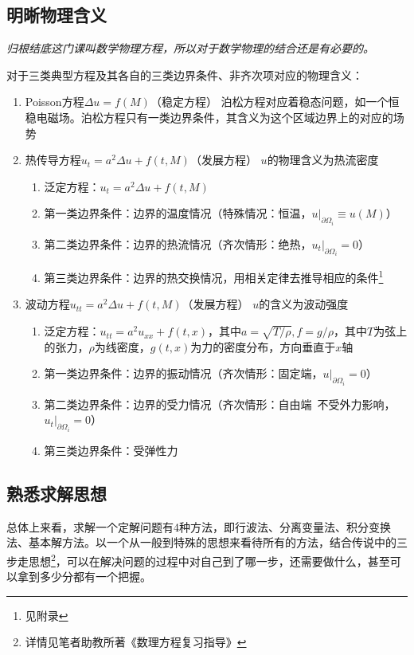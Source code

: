 \documentclass[]{report}
\begin{document}
		\subsection{明晰物理含义}
		\textit{归根结底这门课叫数学物理方程，所以对于数学物理的结合还是有必要的。}\par
		对于三类典型方程及其各自的三类边界条件、非齐次项对应的物理含义：\par
		\begin{enumerate}
			\item Poisson方程$\Delta u=f(M)$（稳定方程）\newline
			泊松方程对应着稳态问题，如一个恒稳电磁场。泊松方程只有一类边界条件，其含义为这个区域边界上的对应的场势
			\item 热传导方程$u_t=a^2\Delta u+f(t,M)$（发展方程）\newline
			$u$的物理含义为热流密度
			\begin{enumerate}
				\item 泛定方程：$u_t=a^2\Delta u+f(t,M)$
				\item 第一类边界条件：边界的温度情况（特殊情况：恒温，$u|_{\partial\Omega_i}\equiv u(M)$）
				\item 第二类边界条件：边界的热流情况（齐次情形：绝热，$u_t\vert_{\partial\Omega_i}=0$）
				\item 第三类边界条件：边界的热交换情况，用相关定律去推导相应的条件\footnote{见附录}
			\end{enumerate}
			\item 波动方程$u_{tt}=a^2\Delta u+f(t,M)$（发展方程）\newline
			$u$的含义为波动强度
			\begin{enumerate}
				\item 泛定方程：$u_{tt}=a^2u_{xx}+f(t,x)$，其中$a=\sqrt{T/\rho},f=g/\rho$，其中$T$为弦上的张力，$\rho$为线密度，$g(t,x)$为力的密度分布，方向垂直于$x$轴
				\item 第一类边界条件：边界的振动情况（齐次情形：固定端，$u|_{\partial\Omega_i}=0$）
				\item 第二类边界条件：边界的受力情况（齐次情形：自由端\ 不受外力影响，$u_t|_{\partial\Omega_i}=0$）
				\item 第三类边界条件：受弹性力
			\end{enumerate}
		\end{enumerate}\par
		\subsection{熟悉求解思想}
		总体上来看，求解一个定解问题有4种方法，即行波法、分离变量法、积分变换法、基本解方法。以一个从一般到特殊的思想来看待所有的方法，结合传说中的三步走思想\footnote{详情见笔者助教所著《数理方程复习指导》}，可以在解决问题的过程中对自己到了哪一步，还需要做什么，甚至可以拿到多少分都有一个把握。\par
\end{document}
